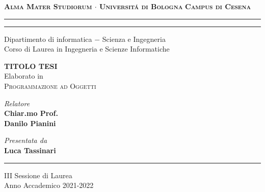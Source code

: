 \begin{titlepage}
    \begin{center}
        {\Large
            \textbf{
                \textsc{Alma Mater Studiorum $\cdot$ Universit\'a di Bologna}
            }
        }
        {\large
            \textbf{
                \textsc{Campus di Cesena}
            }
        }
        \rule[0.1cm]{15.8cm}{0.1mm}
        \rule[0.5cm]{15.8cm}{0.6mm}
        {\Large
                Dipartimento di informatica $-$ Scienza e Ingegneria \\
        }
        \vspace*{4mm}
        {\Large 
            Corso di Laurea in Ingegneria e Scienze Informatiche
        }
        \vspace*{15mm}
        \begin{center}
            {\LARGE
                \textbf{
                    TITOLO TESI
                }
            } \\
            \vspace*{15mm}
            {\Large
                Elaborato in 
            } \\
            \vspace*{3mm}
            {\Large
                \textsc{Programmazione ad Oggetti}
            }
        \end{center}
        \vspace*{40mm}
        \begin{minipage}[t]{0.47\textwidth}
            {\large
                \textit{Relatore} \\
                \textbf{
                    Chiar.mo Prof.\\
                    Danilo Pianini
                }
            }
        \end{minipage}
        \begin{minipage}[t]{0.47\textwidth}\raggedleft
            {\large
                \textit{Presentata da} \\
                \textbf{Luca Tassinari}
            }
        \end{minipage}
    \end{center}
    \vspace*{30mm}
    \rule[0.1cm]{15.8cm}{0.1mm}
    \begin{center}
        {\large
            III Sessione di Laurea
        } \\
        \vspace*{2mm}
        {\large
            Anno Accademico 2021-2022
        }
    \end{center}
\end{titlepage}